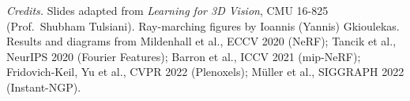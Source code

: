 \documentclass[11pt,a4paper]{article}
\theoremstyle{definition}
\theoremstyle{plain}
\begin{document}
\vfill
\small\textit{Credits.} Slides adapted from \emph{Learning for 3D Vision}, CMU 16-825 (Prof.\ Shubham Tulsiani). Ray-marching figures by Ioannis (Yannis) Gkioulekas. Results and diagrams from Mildenhall et al., ECCV 2020 (NeRF); Tancik et al., NeurIPS 2020 (Fourier Features); Barron et al., ICCV 2021 (mip-NeRF); Fridovich-Keil, Yu et al., CVPR 2022 (Plenoxels); M\"uller et al., SIGGRAPH 2022 (Instant-NGP).
\end{document}

